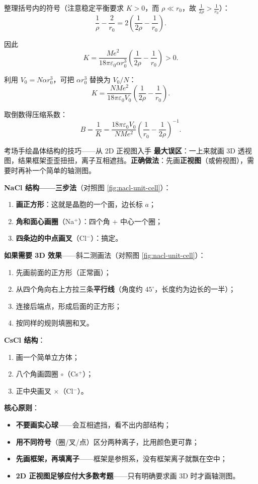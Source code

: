 整理括号内的符号（注意稳定平衡要求 $K>0$，而 $\rho \ll r_0$，故 $\frac{1}{2\rho} > \frac{1}{r_0}$）：
\[
  \frac{1}{\rho} - \frac{2}{r_0} = 2\left(\frac{1}{2\rho} - \frac{1}{r_0}\right).
\]

因此
\[
  K = \frac{Me^2}{18\pi\varepsilon_0\alpha r_0^3}
      \left(\frac{1}{2\rho} - \frac{1}{r_0}\right) > 0.
\]

利用 $V_0 = N\alpha r_0^3$，可把 $\alpha r_0^3$ 替换为 $V_0/N$：
\[
  K = \frac{NMe^2}{18\pi\varepsilon_0 V_0}
      \left(\frac{1}{2\rho} - \frac{1}{r_0}\right).
\]

取倒数得压缩系数：
\[
  \boxed{ B = \frac{1}{K}
         = \frac{18\pi\varepsilon_0 V_0}{NMe^2}
           \left(\frac{1}{r_0} - \frac{1}{2\rho}\right)^{-1} }.
\]

\begin{insightbox}{考场手绘晶体结构的技巧——从 2D 正视图入手}
\textbf{最大误区}：一上来就画 3D 透视图，结果框架歪歪扭扭，离子互相遮挡。\textbf{正确做法}：先画\textbf{正视图}（或俯视图），需要时再补一个简单的轴测图。

\textbf{NaCl 结构——三步法}（对照图 \ref{fig:nacl-unit-cell}）：
\begin{enumerate}[nosep]
  \item \textbf{画正方形}：这就是晶胞的一个面，边长标 $a$；
  \item \textbf{角和面心画圈}（Na$^+$）：四个角 + 中心一个圈；
  \item \textbf{四条边的中点画叉}（Cl$^-$）：搞定。
\end{enumerate}

\textbf{如果需要 3D 效果}——斜二测画法（对照图 \ref{fig:nacl-unit-cell}）：
\begin{enumerate}[nosep]
  \item 先画前面的正方形（正常画）；
  \item 从四个角向右上方拉三条\textbf{平行线}（角度约 $45^\circ$，长度约为边长的一半）；
  \item 连接后端点，形成后面的正方形；
  \item 按同样的规则填圈和叉。
\end{enumerate}

\textbf{CsCl 结构}：
\begin{enumerate}[nosep]
  \item 画一个简单立方体；
  \item 八个角画圆圈 $\circ$（Cs$^+$）；
  \item 正中央画叉 $\times$（Cl$^-$）。
\end{enumerate}

\textbf{核心原则}：
\begin{itemize}[nosep]
  \item \textbf{不要画实心球}——会互相遮挡，看不出内部结构；
  \item \textbf{用不同符号}（圈/叉/点）区分两种离子，比用颜色更可靠；
  \item \textbf{先画框架，再填离子}——框架是参照系，没有框架离子就飘在空中；
  \item \textbf{2D 正视图足够应付大多数考题}——只有明确要求画 3D 时才画轴测图。
\end{itemize}
\end{insightbox}




